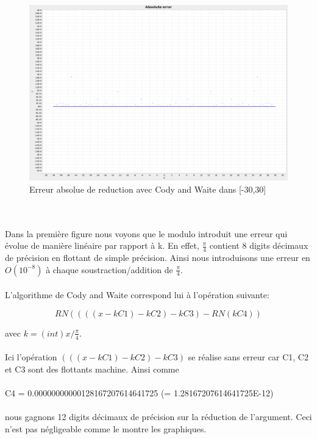 \documentclass[12pt]{article}
\begin{document}
\begin{figure}[ht]
    \begin{center}
      \includegraphics[scale=0.28]{AbsoluteErrorRangeRed.png}
      \caption{Erreur absolue de reduction avec Cody and Waite dans [-30,30]}
      \label{Erreur absolue de reduction avec Cody and Waite}
    \end{center}
\end{figure}
\\
\\
Dans la première figure nous voyons que le modulo introduit une erreur qui évolue de manière
linéaire par rapport à k. En effet, $\frac{\pi}{4}$ contient 8 digits décimaux de précision en flottant
de simple précision. Ainsi
nous introduisons une erreur en $O(10^{-8})$ à chaque soustraction/addition de $\frac{\pi}{4}$.\\
\\
L'algorithme de Cody and Waite correspond lui à l'opération suivante:
\begin{center}
\begin{equation}
  RN((((x - kC1) - kC2) - kC3) - RN(kC4))
\end{equation}
\end{center}
avec $k = (int) x / \frac{\pi}{4}$.\\ \\
Ici l'opération $(((x - kC1) - kC2) - kC3)$ se réalise sans erreur car C1, C2 et C3 sont des flottants machine.
Ainsi comme \\ \\
C4 = 0.00000000000128167207614641725 (= 1.28167207614641725E-12) \\ \\
nous gagnons 12 digits décimaux de précision sur la réduction de l'argument. Ceci n'est pas négligeable comme le montre les graphiques.
\\ \\
\end{document}
